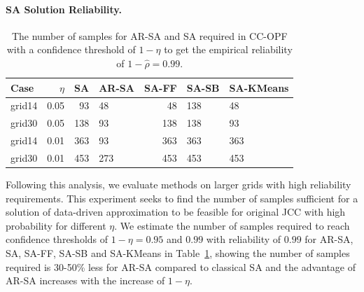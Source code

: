 \paragraph{ SA Solution Reliability.}
\begin{table}[t]
\caption{The number of samples for AR-SA and SA required in CC-OPF with a confidence threshold of $1-\eta$ to get the empirical reliability of $1-\hat{\rho} = 0.99$. 
    }
    \centering
        \begin{tabular}{|lr|rlrll|}
        \toprule
        Case & $\eta$ & SA & AR-SA & SA-FF & SA-SB & SA-KMeans \\
\midrule
grid14 & 0.05 & 93 & 48 & 48 & 138 & 48 \\
grid30 & 0.05 & 138 & 93 & 138 & 138 & 93 \\
grid14 & 0.01 & 363 & 93 & 363 & 363 & 363 \\
grid30 & 0.01 & 453 & 273 & 453 & 453 & 453 \\
\bottomrule
        \end{tabular}
    \label{tab:summary_results}
\end{table}
Following this analysis, we evaluate methods on larger grids with high reliability requirements. %
This experiment seeks to find the number of samples sufficient for a solution of data-driven approximation to be feasible for original JCC with high probability for different $\eta$.
We estimate the number of samples required to reach confidence thresholds of $1-\eta = 0.95$ and $0.99$ with reliability of $0.99$ for AR-SA, SA, SA-FF, SA-SB and SA-KMeans in Table~\ref{tab:summary_results}, showing the number of samples required is 30-50\% less for AR-SA compared to classical SA and the advantage of AR-SA increases with the increase of $1-\eta$.

